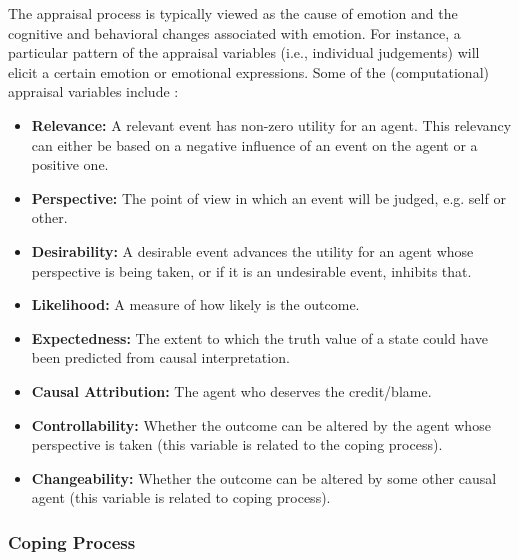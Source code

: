 \documentclass[12pt]{report}
\begin{document}
The appraisal process is typically viewed as the cause of emotion and the
cognitive and behavioral changes associated with emotion. For instance, a
particular pattern of the appraisal variables (i.e., individual judgements) will
elicit a certain emotion or emotional expressions. Some of the (computational)
appraisal variables include \cite{marsella:ema-process-model}:

\begin{itemize}
  \item \textbf{Relevance:} A relevant event has non-zero utility for an agent.
  This relevancy can either be based on a negative influence of an event on the
  agent or a positive one.
  
  \item \textbf{Perspective:} The point of view in which an event will be
  judged, e.g. self or other.
  
  \item \textbf{Desirability:} A desirable event advances the utility for an
  agent whose perspective is being taken, or if it is an undesirable event,
  inhibits that.
  
  \item \textbf{Likelihood:} A measure of how likely is the outcome.
  
  \item \textbf{Expectedness:} The extent to which the truth value of a state
  could have been predicted from causal interpretation.
  
  \item \textbf{Causal Attribution:} The agent who deserves the credit/blame.
  
  \item \textbf{Controllability:} Whether the outcome can be altered by the
  agent whose perspective is taken (this variable is related to the coping
  process).
  
  \item \textbf{Changeability:} Whether the outcome can be altered by some other
  causal agent (this variable is related to coping process).
\end{itemize}

\subsubsection{Coping Process}
\label{sec:coping-process}
\end{document}
